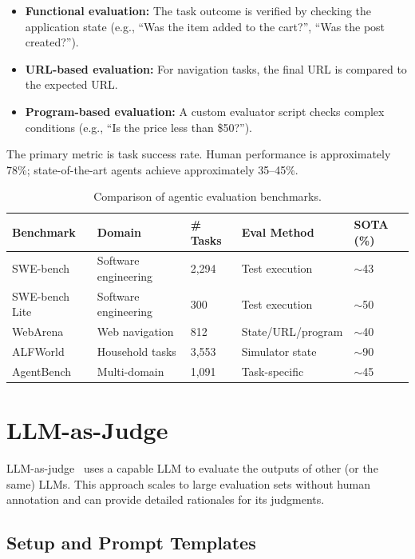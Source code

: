 \begin{itemize}
  \item \textbf{Functional evaluation:} The task outcome is verified by checking the application state (e.g., ``Was the item added to the cart?'', ``Was the post created?'').
  \item \textbf{URL-based evaluation:} For navigation tasks, the final URL is compared to the expected URL.
  \item \textbf{Program-based evaluation:} A custom evaluator script checks complex conditions (e.g., ``Is the price less than \$50?'').
\end{itemize}

The primary metric is task success rate. Human performance is approximately 78\%; state-of-the-art agents achieve approximately 35--45\%.

\begin{table}[ht!]
\centering
\caption{Comparison of agentic evaluation benchmarks.}
\begin{tabular}{@{}lp{3cm}p{3.2cm}p{3.2cm}p{3.5cm}@{}}
\toprule
\textbf{Benchmark} & \textbf{Domain} & \textbf{\# Tasks} & \textbf{Eval Method} & \textbf{SOTA (\%)} \\
\midrule
SWE-bench & Software engineering & 2,294 & Test execution & $\sim$43 \\
SWE-bench Lite & Software engineering & 300 & Test execution & $\sim$50 \\
WebArena & Web navigation & 812 & State/URL/program & $\sim$40 \\
ALFWorld~\cite{shridhar2021alfworld} & Household tasks & 3,553 & Simulator state & $\sim$90 \\
AgentBench~\cite{liu2023agentbench} & Multi-domain & 1,091 & Task-specific & $\sim$45 \\
\bottomrule
\end{tabular}
\end{table}

\section{LLM-as-Judge}
\label{subsec:llm-as-judge}

LLM-as-judge~\cite{zheng2023judging} uses a capable LLM to evaluate the outputs of other (or the same) LLMs. This approach scales to large evaluation sets without human annotation and can provide detailed rationales for its judgments.

\subsection{Setup and Prompt Templates}
\label{setup-and-prompt-templates}

